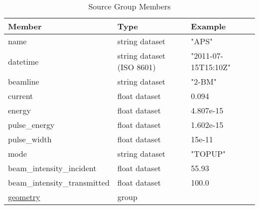 \begin{table}[h!]\sffamily \footnotesize
\centering
\caption{Source Group Members}
\begin{tabular}{l l l}
\toprule
\bfseries Member     & \bfseries Type & \bfseries Example \\
\midrule
name & string dataset & "APS" \\ 
datetime & string dataset (ISO 8601) & "2011-07-15T15:10Z" \\
beamline & string dataset & "2-BM" \\ 
current & float dataset &  0.094 \\
energy & float dataset & 4.807e-15 \\
pulse\_energy & float dataset & 1.602e-15 \\
pulse\_width & float dataset & 15e-11 \\
mode & string dataset & "TOPUP" \\
beam\_intensity\_incident & float dataset & 55.93 \\
beam\_intensity\_transmitted & float dataset & 100.0 \\
\hyperref[table:geometry]{geometry} &  group & \\
\bottomrule
\end{tabular}
\end{table}

